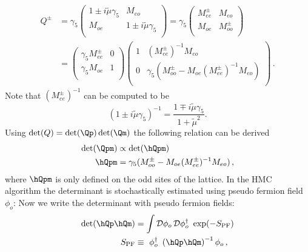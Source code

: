 \begin{equation}
  \label{eq:eo2}
  \begin{split}
    Q^\pm &= \gamma_5\begin{pmatrix}
      1\pm i\tilde\mu\gamma_5 & M_{eo} \\
      M_{oe}    & 1\pm i\tilde\mu\gamma_5 \\
    \end{pmatrix} =
    \gamma_5\begin{pmatrix}
      M_{ee}^\pm & M_{eo} \\
      M_{oe}    & M_{oo}^\pm \\
    \end{pmatrix} \\
    & =
    \begin{pmatrix}
      \gamma_5M_{ee}^\pm & 0 \\
      \gamma_5M_{oe}  & 1 \\
    \end{pmatrix}
    \begin{pmatrix}
      1       & (M_{ee}^\pm)^{-1}M_{eo}\\
      0       & \gamma_5(M_{oo}^\pm-M_{oe}(M_{ee}^\pm)^{-1}M_{eo})\\
    \end{pmatrix}\, .
\end{split}
\end{equation}
Note that $(M_{ee}^\pm)^{-1}$ can be
computed to be 
\begin{equation}
  \label{eq:eo3}
  (1\pm i\tilde\mu\gamma_5)^{-1} = \frac{1\mp i\tilde\mu\gamma_5}{1+\tilde\mu^2}.
\end{equation}
Using $\det(Q)=\det(\Qp)\det(\Qm)$ the following relation can be derived
\begin{equation}
  \label{eq:eo4}
  \begin{split}
    \det(\Qpm) &\propto \det(\hQpm) \\
    \hQpm &= \gamma_5(M_{oo}^\pm - M_{oe}(M_{ee}^\pm )^{-1}M_{eo})\, ,
  \end{split}
\end{equation}
where $\hQpm$ is only defined on the odd sites of the lattice. In the
HMC algorithm the determinant is stochastically estimated using pseudo
fermion field $\phi_o$: Now we write the determinant with pseudo
fermion fields:
\begin{equation}
  \begin{split}
    \det(\hQp \hQm) &= \int \mathcal{D}\phi_o\,\mathcal{D}\phi^\dagger_o\
    \exp(-S_\mathrm{PF})\\
    S_\mathrm{PF} &\equiv\ \phi_o^\dagger\ \left(\hQp\hQm\right)^{-1}\phi_o\, ,
  \end{split}
\end{equation}
